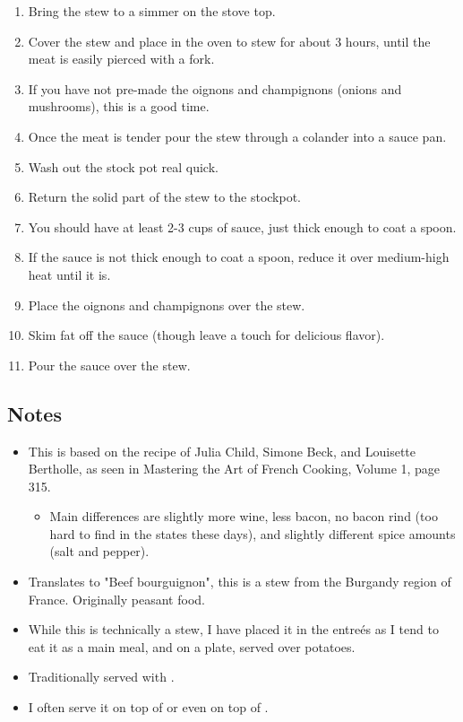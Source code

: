 \begin{multicols}{2}
\begin{enumerate}
    \item Bring the stew to a simmer on the stove top.
    \item Cover the stew and place in the oven to stew for about 3 hours, until the meat is easily pierced with a fork.
    \item If you have not pre-made the oignons and champignons (onions and mushrooms), this is a good time.
    \item Once the meat is tender pour the stew through a colander into a sauce pan.
    \item Wash out the stock pot real quick.
    \item Return the solid part of the stew to the stockpot.
    \item You should have at least 2-3 cups of sauce, just thick enough to coat a spoon.
    \item If the sauce is not thick enough to coat a spoon, reduce it over medium-high heat until it is.
    \item Place the oignons and champignons over the stew.
    \item Skim fat off the sauce (though leave a touch for delicious flavor).
    \item Pour the sauce over the stew.
\end{enumerate}

\subsection*{Notes}
\begin{itemize}
    \item This is based on the recipe of Julia Child, Simone Beck, and Louisette Bertholle, as seen in Mastering the Art of French Cooking, Volume 1, page 315.
    \begin{itemize}
        \item Main differences are slightly more wine, less bacon, no bacon rind (too hard to find in the states these days), and slightly different spice amounts (salt and pepper).
    \end{itemize}
    \item Translates to "Beef bourguignon", this is a stew from the Burgandy region of France. Originally peasant food.
    \item While this is technically a stew, I have placed it in the entreés as I tend to eat it as a main meal, and on a plate, served over potatoes.
    \item Traditionally served with .
    \item I often serve it on top of  or even on top of .
\end{itemize}
\end{multicols}
\clearpage